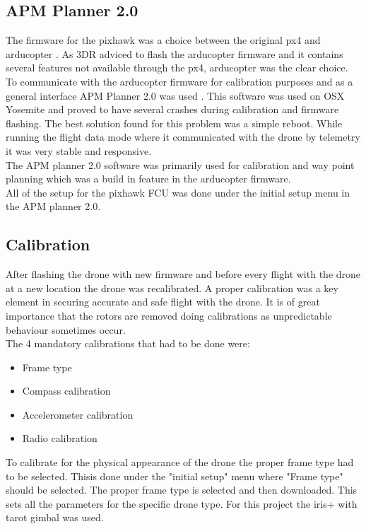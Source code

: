 \subsection*{APM Planner 2.0}
The firmware for the pixhawk was a choice between the original px4 and arducopter
\cite{Ref:Arducopter}. As 3DR adviced to flash the arducopter firmware and it contains several
features not available through the px4, arducopter was the clear choice.\\
To communicate with the arducopter firmware for calibration purposes and as a general interface APM
Planner 2.0 was used \cite{Ref:APM2}. This software was used on OSX Yosemite and proved to have
several crashes during calibration and firmware flashing. The best solution found for this problem
was a simple reboot. While running the flight data mode where it communicated with the drone by
telemetry it was very stable and responsive.\\
The APM planner 2.0 software was primarily used for calibration and way point planning which was a
build in feature in the arducopter firmware.\\
All of the setup for the pixhawk FCU was done under the initial setup menu in the APM planner 2.0.

\subsection*{Calibration}

After flashing the drone with new firmware and before every flight with the drone at a new location
the drone was recalibrated. A proper calibration was a key element in securing accurate and safe
flight with the drone. It is of great importance that the rotors are removed doing calibrations as
unpredictable behaviour sometimes occur.\\
The 4 mandatory calibrations that had to be done were:
\begin{itemize}
\item Frame type
\item Compass calibration
\item Accelerometer calibration
\item Radio calibration
\end{itemize}

To calibrate for the physical appearance of the drone the proper frame type had to be selected.
Thisis done under the "initial setup" menu where "Frame type" should be selected. The proper frame
type
is selected and then downloaded. This sets all the parameters for the specific drone type. For this
project the iris+ with tarot gimbal was used.\\

